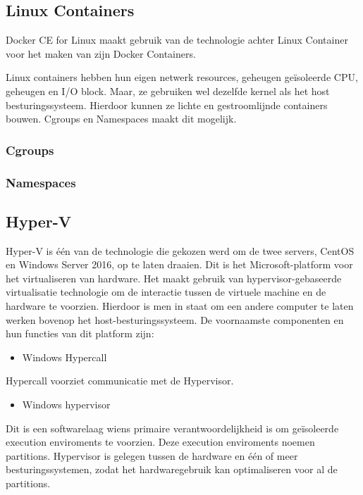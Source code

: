 \subsection{Linux Containers}
Docker CE for Linux maakt gebruik van de technologie achter Linux Container voor het maken van zijn Docker Containers.

Linux containers hebben hun eigen netwerk resources, geheugen geïsoleerde CPU, geheugen en I/O block. Maar, ze gebruiken wel dezelfde kernel als het host besturingssysteem. Hierdoor kunnen ze lichte en gestroomlijnde containers bouwen. Cgroups en Namespaces maakt dit mogelijk.

\subsubsection{Cgroups}


\subsubsection{Namespaces}


\subsection{Hyper-V}
Hyper-V is één van de technologie die gekozen werd om de twee servers, CentOS en Windows Server 2016, op te laten draaien. Dit is het Microsoft-platform voor het virtualiseren van hardware. Het maakt gebruik van hypervisor-gebaseerde virtualisatie technologie om de interactie tussen de virtuele machine en de hardware te voorzien. Hierdoor is men in staat om een andere computer te laten werken bovenop het host-besturingssysteem. De voornaamste componenten en hun functies van dit platform zijn:

\begin{itemize}[noitemsep]
	\item Windows Hypercall
\end{itemize}

Hypercall voorziet communicatie met de Hypervisor.

\begin{itemize}[noitemsep]
	\item Windows hypervisor
\end{itemize}

Dit is een softwarelaag wiens primaire verantwoordelijkheid is om geïsoleerde execution enviroments te voorzien. Deze execution enviroments noemen partitions. Hypervisor is gelegen tussen de hardware en één of meer besturingssystemen, zodat het hardwaregebruik kan optimaliseren voor al de partitions.

